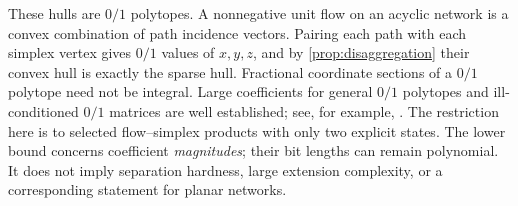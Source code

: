 These hulls are $0/1$ polytopes. A nonnegative unit flow on an acyclic
network is a convex combination of path incidence vectors. Pairing each
path with each simplex vertex gives $0/1$ values of $x,y,z$, and by
\cref{prop:disaggregation} their convex hull is exactly the sparse hull.
Fractional coordinate sections of a $0/1$ polytope need not be integral.
Large coefficients for general $0/1$ polytopes and ill-conditioned $0/1$
matrices are well established; see, for example, \citet{AlonVu1997}.
The restriction here is to selected flow--simplex products with only two
explicit states. The lower bound concerns coefficient \emph{magnitudes};
their bit lengths can remain polynomial. It does not imply separation
hardness, large extension complexity, or a corresponding statement for
planar networks.
